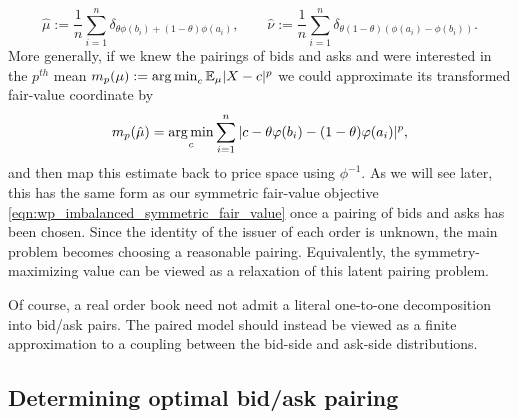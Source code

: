 \[\hat{\mu} := \frac{1}{n} \sum_{i=1}^n
\delta_{\theta\phi(b_i)+(1-\theta)\phi(a_i)}, \qquad
\hat{\nu} := \frac{1}{n} \sum_{i=1}^n
\delta_{\theta(1-\theta)(\phi(a_i)-\phi(b_i))}.\]
\noindent More generally, if we knew the pairings of bids and asks and were
 interested in the $p^{th}$ mean $m_p(\mu) := \operatorname*{arg\,min}_c \mathbb{E}_\mu |X-c|^p$ we
 could approximate its transformed fair-value coordinate by
\[m_p(\hat{\mu}) = \operatorname*{arg\,min}_c \sum_{i=1}^n
|c-\theta\varphi(b_i)-(1-\theta)\varphi(a_i)|^p,\]
%
\noindent and then map this estimate back to price space using $\phi^{-1}$.
 \noindent As we will see later, this has the same form as our symmetric fair-value objective \eqref{eqn:wp_imbalanced_symmetric_fair_value} once a pairing of bids and asks has been chosen.
 Since the identity of the issuer of each order is unknown, the main problem becomes choosing a reasonable pairing.
 Equivalently, the symmetry-maximizing value can be viewed as a relaxation of this latent pairing problem.

 Of course, a real order book need not admit a literal one-to-one
decomposition into bid/ask pairs. The paired model should instead be viewed as
a finite approximation to a coupling between the bid-side and ask-side
distributions.

\subsection{Determining optimal bid/ask pairing}

